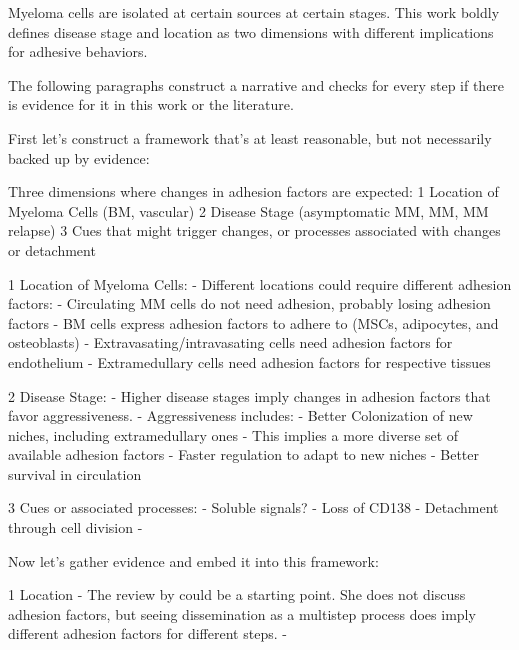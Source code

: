Myeloma cells are isolated at certain sources at certain stages. This work
boldly defines disease stage and location as two dimensions with different implications
for adhesive behaviors.

The following paragraphs construct a narrative and checks for every step if there is
evidence for it in this work or the literature.

First let's construct a framework that's at least reasonable, but not necessarily
backed up by evidence:

Three dimensions where changes in adhesion factors are expected:
1 Location of Myeloma Cells (BM, vascular)
2 Disease Stage (asymptomatic MM, MM, MM relapse)
3 Cues that might trigger changes, or processes associated with changes or detachment


1 Location of Myeloma Cells:
- Different locations could require different adhesion factors:
- Circulating MM cells do not need adhesion, probably losing adhesion factors
- BM cells express adhesion factors to adhere to (MSCs, adipocytes, and osteoblasts)
- Extravasating/intravasating cells need adhesion factors for endothelium
- Extramedullary cells need adhesion factors for respective tissues

2 Disease Stage:
- Higher disease stages imply changes in adhesion factors that favor aggressiveness.
- Aggressiveness includes:
- Better Colonization of new niches, including extramedullary ones
- This implies a more diverse set of available adhesion factors
- Faster regulation to adapt to new niches
- Better survival in circulation

3 Cues or associated processes:
- Soluble signals?
- Loss of CD138 \cite{akhmetzyanovaDynamicCD138Surface2020}
- Detachment through cell division
-


Now let's gather evidence and embed it into this framework:

1 Location
- The review by \cite{zeissigTumourDisseminationMultiple2020} could be a starting point. She does not
discuss adhesion factors, but seeing dissemination as a multistep process does imply
different adhesion factors for different steps.
- 



